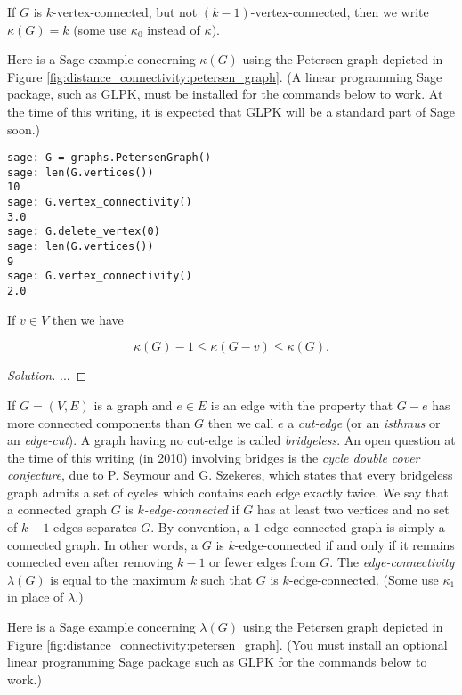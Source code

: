 If $G$ is $k$-vertex-connected, but not
$(k-1)$-vertex-connected, then we write $\kappa(G)=k$
(some use $\kappa_0$ instead of $\kappa$).

Here is a Sage example concerning
$\kappa(G)$ using the Petersen graph
depicted in Figure \ref{fig:distance_connectivity:petersen_graph}.
(A linear programming
Sage package, such as GLPK, must be installed
for the commands below to work. At the time of this writing, it is
expected that GLPK will be a standard part of Sage soon.)
%
\begin{lstlisting}
sage: G = graphs.PetersenGraph()
sage: len(G.vertices())
10
sage: G.vertex_connectivity()
3.0
sage: G.delete_vertex(0)
sage: len(G.vertices())
9
sage: G.vertex_connectivity()
2.0
\end{lstlisting}

\begin{lemma}
{\rm
If $v\in V$ then we have

\[
\kappa(G)-1\leq \kappa(G-v)\leq \kappa(G).
\]
}
\end{lemma}

\begin{proof}[Solution]

...
\end{proof}


If $G=(V,E)$ is a graph and $e\in E$ is an edge with the property
that $G-e$ has more connected components than $G$ then
we call $e$ a {\it cut-edge} (or an {\it isthmus} or an {\it edge-cut}).
A graph having no cut-edge is called {\it bridgeless}.
An open question at the time of this writing
(in 2010) involving bridges is the
{\it cycle double cover conjecture}, due to P. Seymour and G. Szekeres,
which states that every bridgeless graph admits a set
of cycles which contains each edge exactly twice.
We say that a connected graph $G$ is {\it $k$-edge-connected}
if
$G$ has at least two vertices and no set of $k-1$ edges separates $G$.
By convention, a $1$-edge-connected graph is simply a connected
graph. In other words, a $G$ is $k$-edge-connected if and only if
it remains connected even after removing $k-1$ or fewer edges
from $G$. The {\it edge-connectivity}
$\lambda(G)$ is equal to the maximum $k$ such that
$G$ is $k$-edge-connected. (Some use
$\kappa_1$ in place of $\lambda$.)

Here is a Sage example concerning
$\lambda(G)$ using the Petersen graph
depicted in Figure \ref{fig:distance_connectivity:petersen_graph}.
(You must install an optional linear programming
Sage package such as GLPK for the commands below to work.)

